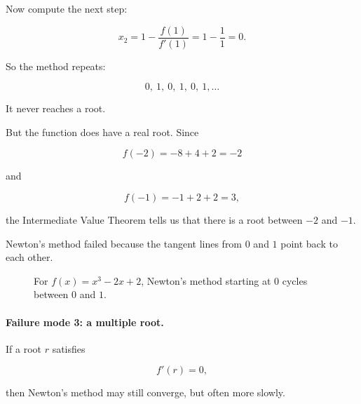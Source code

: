 Now compute the next step:

\[
x_2
=
1-\frac{f(1)}{f'(1)}
=
1-\frac{1}{1}
=
0.
\]

So the method repeats:

\[
0,\ 1,\ 0,\ 1,\ 0,\ 1,\ldots
\]

It never reaches a root.

But the function does have a real root.  Since

\[
f(-2)=-8+4+2=-2
\]

and

\[
f(-1)=-1+2+2=3,
\]

the Intermediate Value Theorem tells us that there is a root between \(-2\) and
\(-1\).

Newton's method failed because the tangent lines from \(0\) and \(1\) point back to
each other.

\begin{figure}[h]
\centering
{}
\caption{For \(f(x)=x^3-2x+2\), Newton's method starting at \(0\) cycles between \(0\) and \(1\).}
\label{fig:newton-cycle}
\end{figure}

\paragraph{Failure mode 3: a multiple root.}
If a root \(r\) satisfies

\[
f'(r)=0,
\]

then Newton's method may still converge, but often more slowly.

